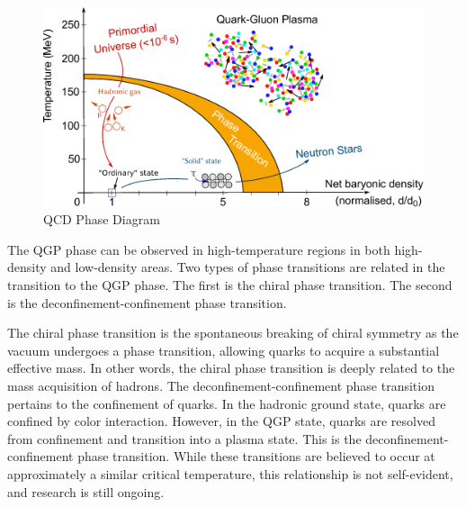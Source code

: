         \begin{figure}[hbtp]
            \centering
            \includegraphics[keepaspectratio, scale=0.6]{fig/1_4_QCDPhaseDiagram.png}
            \caption{QCD Phase Diagram\cite{QCDPhaseDiagram}}
            \label{QCD_Phase_Diagram}
        \end{figure}
        The QGP phase can be observed in high-temperature regions in both high-density and low-density areas. Two types of phase transitions are related in the transition to the QGP phase. The first is the chiral phase transition. The second is the deconfinement-confinement phase transition.  
        
        The chiral phase transition is the spontaneous breaking of chiral symmetry as the vacuum undergoes a phase transition, allowing quarks to acquire a substantial effective mass. In other words, the chiral phase transition is deeply related to the mass acquisition of hadrons. 
        The deconfinement-\-confinement phase transition pertains to the con\-finement of quarks. 
        In the hadronic ground state, quarks are confined by color interaction.
        However, in the QGP state, quarks are resolved from confinement and transition into a plasma state. 
        This is the deconfinement-\-confinement phase transition. 
        While these transitions are believed to occur at approximately a similar critical temperature, this relationship is not self-evident, and research is still ongoing.
        
